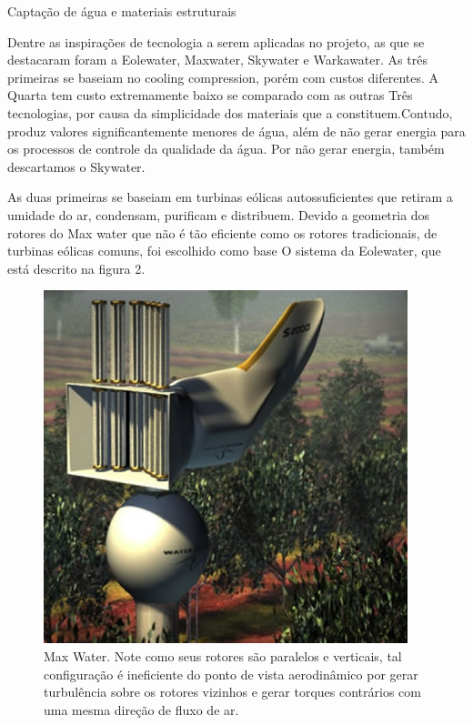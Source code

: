 \documentclass[12pt,openright,oneside,a4paper,brazil]{abntex2}
\begin{document}
\textual
\begin{center}
 {\large Captação de água e materiais estruturais}\\[0.2cm]
 \end{center}
 
Dentre as inspirações de tecnologia a serem aplicadas no projeto, as que se destacaram foram a Eolewater, Maxwater, Skywater e Warkawater. As três primeiras se baseiam no cooling compression, porém com custos diferentes. A Quarta tem custo  extremamente baixo se comparado com as outras Três tecnologias, por causa da simplicidade dos materiais que a constituem.Contudo, produz valores significantemente menores de água, além de não gerar energia para os processos de controle da qualidade da água. Por não gerar energia, também descartamos o Skywater.

As duas primeiras se baseiam em turbinas eólicas autossuficientes que retiram a umidade do ar, condensam, purificam e distribuem. Devido a geometria dos rotores do Max water que não é tão eficiente como os rotores tradicionais, de turbinas eólicas comuns, foi escolhido como base O sistema da Eolewater, que está descrito na figura 2.

\begin{figure}[!ht]
\centering
\includegraphics[scale=0.6]{max_water}
\caption[Caption title in LOF]{Max Water. Note como seus rotores são paralelos e verticais, tal configuração é ineficiente do ponto de vista aerodinâmico por gerar turbulência sobre os rotores vizinhos e gerar torques contrários com uma mesma direção de fluxo de ar.\footnotemark}

\label{Max_Water}
\end{figure}
\end{document}
